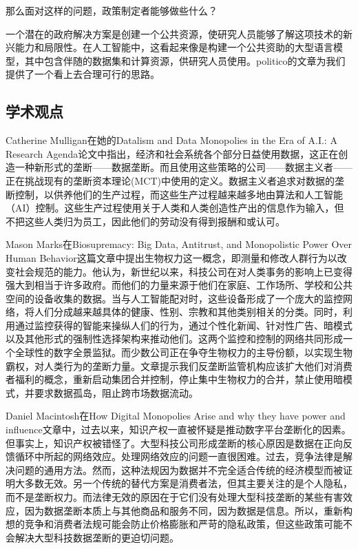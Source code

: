 \documentclass[11pt]{article}
\begin{document}
那么面对这样的问题，政策制定者能够做些什么？

一个潜在的政府解决方案是创建一个公共资源，使研究人员能够了解这项技术的新兴能力和局限性。在人工智能中，这看起来像是构建一个公共资助的大型语言模型，其中包含伴随的数据集和计算资源，供研究人员使用。politico的文章为我们提供了一个看上去合理可行的思路。

\subsection{学术观点}

Catherine Mulligan在她的Datalism and Data Monopolies in the Era of A.I.: A Research Agenda论文中指出，经济和社会系统各个部分日益使用数据，这正在创造一种新形式的垄断——数据垄断。而且使用这些策略的公司——数据主义者——正在挑战现有的垄断资本理论(MCT)中使用的定义。数据主义者追求对数据的垄断控制，以供养他们的生产过程，而这些生产过程越来越多地由算法和人工智能（AI）控制。这些生产过程使用关于人类和人类创造性产出的信息作为输入，但不把这些人类归为员工，因此他们的劳动没有得到报酬和或认可。

Mason Marks在Biosupremacy: Big Data, Antitrust, and Monopolistic Power Over Human Behavior这篇文章中提出生物权力这一概念，即测量和修改人群行为以改变社会规范的能力。他认为，新世纪以来，科技公司在对人类事务的影响上已变得强大到相当于许多政府。而他们的力量来源于他们在家庭、工作场所、学校和公共空间的设备收集的数据。当与人工智能配对时，这些设备形成了一个庞大的监控网络，将人们分成越来越具体的健康、性别、宗教和其他类别相关的分类。同时，利用通过监控获得的智能来操纵人们的行为，通过个性化新闻、针对性广告、暗模式以及其他形式的强制性选择架构来推动他们。这两个监控和控制的网络共同形成一个全球性的数字全景监狱。而少数公司正在争夺生物权力的主导份额，以实现生物霸权，对人类行为的垄断力量。文章提示我们反垄断监管机构应该扩大他们对消费者福利的概念，重新启动集团合并控制，停止集中生物权力的合并，禁止使用暗模式，并要求数据孤岛，阻止跨市场数据流动。

Daniel Macintosh在How Digital Monopolies Arise and why they have power and influence文章中，过去以来，知识产权一直被怀疑是推动数字平台垄断化的因素。但事实上，知识产权被错怪了。大型科技公司形成垄断的核心原因是数据在正向反馈循环中所起的网络效应。处理网络效应的问题一直很困难。过去，竞争法律是解决问题的通用方法。然而，这种法规因为数据并不完全适合传统的经济模型而被证明大多数无效。另一个传统的替代方案是消费者法，但其主要关注的是个人隐私，而不是垄断权力。而法律无效的原因在于它们没有处理大型科技垄断的某些有害效应，因为数据垄断本质上与其他商品和服务不同，因为数据是信息。所以，重新构想的竞争和消费者法规可能会防止价格膨胀和严苛的隐私政策，但这些政策可能不会解决大型科技数据垄断的更迫切问题。
\end{document}
